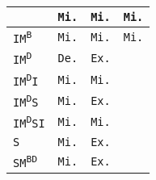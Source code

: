 \begin{tabular}{|l||c|c|c|}
 & \cellcolor{olive!80}\texttt{Mi.}
 & \cellcolor{olive!80}\texttt{Mi.}
 & \cellcolor{olive!80}\texttt{Mi.}
 \\
 \hline

 \texttt{IM\textsuperscript{B}}

 & \cellcolor{olive!80}\texttt{Mi.}
 & \cellcolor{olive!80}\texttt{Mi.}
 & \cellcolor{olive!80}\texttt{Mi.}
 \\
 \hline

 \texttt{IM\textsuperscript{D}}

 & \cellcolor{blue!40}\texttt{De.}
 & \cellcolor{orange!60}\texttt{Ex.}
 & \cellcolor{black!40}
 \\
 \hline

 \texttt{IM\textsuperscript{D}I}

 & \cellcolor{olive!80}\texttt{Mi.}
 & \cellcolor{olive!80}\texttt{Mi.}
 & \cellcolor{black!40}
 \\
 \hline

 \texttt{IM\textsuperscript{D}S}

 & \cellcolor{olive!80}\texttt{Mi.}
 & \cellcolor{orange!60}\texttt{Ex.}
 & \cellcolor{black!40}
 \\
 \hline

 \texttt{IM\textsuperscript{D}SI}

 & \cellcolor{olive!80}\texttt{Mi.}
 & \cellcolor{olive!80}\texttt{Mi.}
 & \cellcolor{black!40}
 \\
 \hline

 \texttt{S}

 & \cellcolor{olive!80}\texttt{Mi.}
 & \cellcolor{orange!60}\texttt{Ex.}
 & \cellcolor{black!40}
 \\
 \hline

 \texttt{SM\textsuperscript{BD}}

 & \cellcolor{olive!80}\texttt{Mi.}
 & \cellcolor{orange!60}\texttt{Ex.}
 & \cellcolor{black!40}
 \\
 \hline


\end{tabular}
